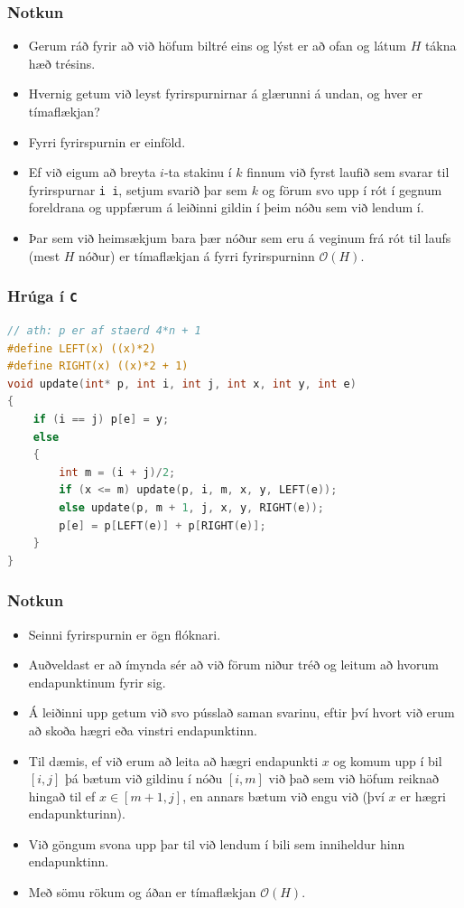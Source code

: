 \documentclass{beamer}
\begin{document}
\begin{frame}
\frametitle{Notkun}
\begin{itemize}
\item<1-> Gerum ráð fyrir að við höfum biltré eins og lýst er að ofan og látum $H$ tákna hæð trésins.
\item<2-> Hvernig getum við leyst fyrirspurnirnar á glærunni á undan, og hver er tímaflækjan?
\item<3-> Fyrri fyrirspurnin er einföld.
\item<4-> Ef við eigum að breyta $i$-ta stakinu í $k$ finnum við fyrst laufið sem svarar til fyrirspurnar \texttt{i i},
	setjum svarið þar sem $k$ og förum svo upp í rót í gegnum foreldrana og uppfærum á leiðinni gildin í þeim nóðu sem við lendum í.
\item<5-> Þar sem við heimsækjum bara þær nóður sem eru á veginum frá rót til laufs (mest $H$ nóður) er tímaflækjan á fyrri fyrirspurninn $\mathcal{O}(H)$.
\end{itemize}
\end{frame}

\begin{frame}[fragile]
	\frametitle{Hrúga í \texttt{C}}
	\tiny
	\begin{lstlisting}[language=C]
// ath: p er af staerd 4*n + 1
#define LEFT(x) ((x)*2)
#define RIGHT(x) ((x)*2 + 1)
void update(int* p, int i, int j, int x, int y, int e)
{
	if (i == j) p[e] = y;
	else
	{
		int m = (i + j)/2;
		if (x <= m) update(p, i, m, x, y, LEFT(e));
		else update(p, m + 1, j, x, y, RIGHT(e));
		p[e] = p[LEFT(e)] + p[RIGHT(e)];
	}
}
\end{lstlisting}
\end{frame}

\begin{frame}
\frametitle{Notkun}
\begin{itemize}
\item<1-> Seinni fyrirspurnin er ögn flóknari.
\item<2-> Auðveldast er að ímynda sér að við förum niður tréð og leitum að hvorum endapunktinum fyrir sig.
\item<3-> Á leiðinni upp getum við svo pússlað saman svarinu, eftir því hvort við erum að skoða hægri eða vinstri endapunktinn.
\item<4-> Til dæmis, ef við erum að leita að hægri endapunkti $x$ og komum upp í bil $[i, j]$ þá bætum við gildinu í nóðu
$[i, m]$ við það sem við höfum reiknað hingað til ef $x \in [m + 1, j]$, en annars bætum við engu við (því $x$ er hægri endapunkturinn).
\item<5-> Við göngum svona upp þar til við lendum í bili sem inniheldur hinn endapunktinn.
\item<6-> Með sömu rökum og áðan er tímaflækjan $\mathcal{O}(H)$.
\end{itemize}
\end{frame}
\end{document}
